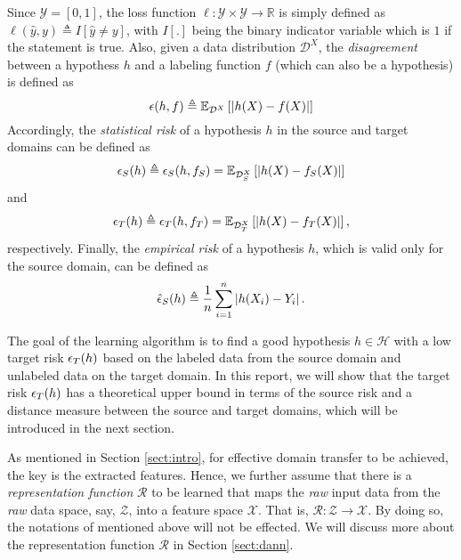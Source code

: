 Since $\mathcal{Y}=[0, 1]$, the loss function $\ell: \mathcal{Y} \times \mathcal{Y} \rightarrow \mathbb{R}$ is simply defined as $\ell (\hat{y},y) \triangleq I \left[ \hat{y} \neq y \right]$, with $I[.]$ being the binary indicator variable which is $1$ if the statement is true. Also, given a data distribution $\mathcal{D}^X$, the \textit{disagreement} between a hypothess $h$ and a labeling function $f$ (which can also be a hypothesis) is defined as
\begin{equation}\label{eq:disagreement}
\epsilon(h, f) \triangleq \mathbb{E}_{\mathcal{D}^X}\left[\left \lvert h(X) - f(X) \right \rvert\right]
\end{equation}
Accordingly, the \textit{statistical risk} of a hypothesis $h$ in the source and target domains can be defined as
\begin{equation}\label{eq:RiskS}
\epsilon_{S}(h) \triangleq \epsilon_{S}(h, f_S) = \mathbb{E}_{\mathcal{D}_S^X}\left[\left \lvert h(X) - f_S(X) \right \rvert\right]
\end{equation}
and
\begin{equation}\label{eq:RiskT}
\epsilon_{T}(h) \triangleq \epsilon_{T}(h, f_T) = \mathbb{E}_{\mathcal{D}_T^X}\left[\left \lvert h(X) - f_T(X) \right \rvert\right],
\end{equation}
respectively. Finally, the \textit{empirical risk} of a hypothesis $h$, which is valid only for the source domain, can be defined as
\begin{equation}\label{eq:ERiskS}
\hat{\epsilon}_{S}(h) \triangleq \frac{1}{n} \sum_{i=1}^{n} \left \lvert h(X_i) - Y_i \right \rvert.
\end{equation}

The goal of the learning algorithm is to find a good hypothesis $h \in \mathcal{H}$ with a low target risk $\epsilon_{T}(h)$ based on the labeled data from the source domain and unlabeled data on the target domain. In this report, we will show that the target risk $\epsilon_{T}(h)$ has a theoretical upper bound in terms of the source risk and a distance measure between the source and target domains, which will be introduced in the next section.

As mentioned in Section \ref{sect:intro}, for effective domain transfer to be achieved, the key is the extracted features. Hence, we further assume that there is a \textit{representation function} $\mathcal{R}$ to be learned that maps the \textit{raw} input data from the \textit{raw} data space, say, $\mathcal{Z}$, into a feature space $\mathcal{X}$. That is, $\mathcal{R}: \mathcal{Z} \rightarrow \mathcal{X}$. By doing so, the notations of mentioned above will not be effected. We will discuss more about the representation function $\mathcal{R}$ in Section \ref{sect:dann}.

